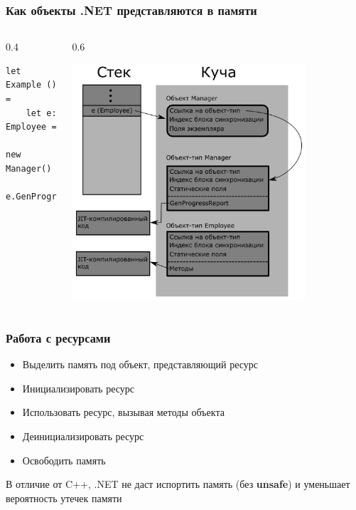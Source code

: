 \documentclass[xetex,mathserif,serif]{beamer}
\begin{document}
    \begin{frame}[fragile]
        \frametitle{Как объекты .NET представляются в памяти}
        \begin{columns}
            \begin{column}{0.4\textwidth}
                \begin{verbatim}
let Example () =
    let e: Employee = 
        new Manager()
    e.GenProgressReport()
                \end{verbatim}
            \end{column}
            \begin{column}{0.6\textwidth}
                \begin{center}
                    \includegraphics[width=0.8\textwidth]{objectInMemory.png}
                \end{center}
            \end{column}
        \end{columns}
    \end{frame}

    \begin{frame}
        \frametitle{Работа с ресурсами}
        \begin{itemize}
            \item Выделить память под объект, представляющий ресурс
            \item Инициализировать ресурс
            \item Использовать ресурс, вызывая методы объекта
            \item Деинициализировать ресурс
            \item Освободить память
        \end{itemize}
        В отличие от C++, .NET не даст испортить память (без \textbf{unsafe}) и уменьшает вероятность утечек памяти
    \end{frame}
\end{document}
